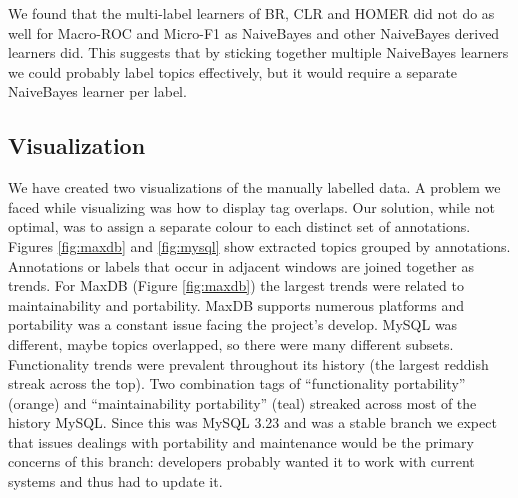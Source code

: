 \documentclass{acm_proc_article-sp}
\begin{document}
We found that the multi-label learners of BR, CLR and HOMER did not do as well for Macro-ROC and Micro-F1 as NaiveBayes and other NaiveBayes derived learners did. This suggests that by sticking together multiple NaiveBayes learners we could probably label topics effectively, but it would require a separate NaiveBayes learner per label.

\subsection{Visualization}

We have created two visualizations of the manually labelled data. A problem we faced while visualizing was how to display tag overlaps. Our solution, while not optimal, was to assign a separate colour to each distinct set of annotations. Figures \ref{fig:maxdb} and \ref{fig:mysql} show extracted topics grouped by annotations. Annotations or labels that occur in adjacent windows are joined together as trends. For MaxDB (Figure \ref{fig:maxdb}) the largest trends were related to maintainability and portability. MaxDB supports numerous platforms and portability was a constant issue facing the project's develop. MySQL was different, maybe topics overlapped, so there were many different subsets. Functionality trends were prevalent throughout its history (the largest reddish streak across the top). Two combination  tags of ``functionality portability'' (orange) and ``maintainability portability'' (teal) streaked across most of the history MySQL. Since this was MySQL 3.23 and was a stable branch we expect that issues dealings with portability and maintenance would be the primary concerns of this branch: developers probably wanted it to work with current systems and thus had to update it.
\end{document}

